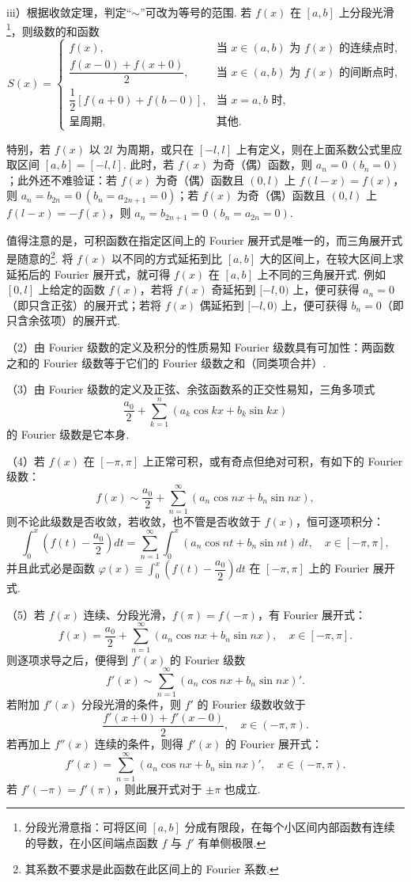 \documentclass[UTF8,12pt,a4paper,fontset=fandol]{ctexart}
\begin{document}
iii）根据收敛定理，判定“$\sim$”可改为等号的范围. 若 $f(x)$ 在 $[a,b]$ 上分段光滑\footnote{分段光滑意指：可将区间 $[a,b]$ 分成有限段，在每个小区间内部函数有连续的导数，在小区间端点函数 $f$ 与 $f'$ 有单侧极限.}，则级数的和函数
\[
S(x)=
\begin{cases}
f(x),&\text{当 }x\in(a,b)\text{ 为 }f(x)\text{ 的连续点时},\\[3pt]
\dfrac{f(x-0)+f(x+0)}2,&\text{当 }x\in(a,b)\text{ 为 }f(x)\text{ 的间断点时},\\[6pt]
\dfrac12[f(a+0)+f(b-0)],&\text{当 }x=a,b\text{ 时},\\[6pt]
\text{呈周期},&\text{其他}.
\end{cases}
\]

特别，若 $f(x)$ 以 $2l$ 为周期，或只在 $[-l,l]$ 上有定义，则在上面系数公式里应取区间 $[a,b]=[-l,l]$. 此时，若 $f(x)$ 为奇（偶）函数，则 $a_n=0\ (b_n=0)$；此外还不难验证：若 $f(x)$ 为奇（偶）函数且 $(0,l)$ 上 $f(l-x)=f(x)$，则 $a_n=b_{2n}=0\ (b_n=a_{2n+1}=0)$；若 $f(x)$ 为奇（偶）函数且 $(0,l)$ 上 $f(l-x)=-f(x)$，则 $a_n=b_{2n+1}=0\ (b_n=a_{2n}=0)$.

值得注意的是，可积函数在指定区间上的 Fourier 展开式是唯一的，而三角展开式是随意的\footnote{其系数不要求是此函数在此区间上的 Fourier 系数.}. 将 $f(x)$ 以不同的方式延拓到比 $[a,b]$ 大的区间上，在较大区间上求延拓后的 Fourier 展开式，就可得 $f(x)$ 在 $[a,b]$ 上不同的三角展开式. 例如 $[0,l]$ 上给定的函数 $f(x)$，若将 $f(x)$ 奇延拓到 $[-l,0)$ 上，便可获得 $a_n=0$（即只含正弦）的展开式；若将 $f(x)$ 偶延拓到 $[-l,0)$ 上，便可获得 $b_n=0$（即只含余弦项）的展开式.

（2）由 Fourier 级数的定义及积分的性质易知 Fourier 级数具有可加性：两函数之和的 Fourier 级数等于它们的 Fourier 级数之和（同类项合并）.

（3）由 Fourier 级数的定义及正弦、余弦函数系的正交性易知，三角多项式
\[
  \frac{a_0}2+\sum_{k=1}^{n}(a_k\cos kx+b_k\sin kx)
\]
的 Fourier 级数是它本身.

（4）若 $f(x)$ 在 $[-\pi,\pi]$ 上正常可积，或有奇点但绝对可积，有如下的 Fourier 级数：
\[
  f(x)\sim\frac{a_0}2+\sum_{n=1}^{\infty}(a_n\cos nx+b_n\sin nx),
\]
则不论此级数是否收敛，若收敛，也不管是否收敛于 $f(x)$，恒可逐项积分：
\[
  \int_0^x\left(f(t)-\frac{a_0}2\right)dt
  =\sum_{n=1}^{\infty}\int_0^x(a_n\cos nt+b_n\sin nt)\,dt,\quad x\in[-\pi,\pi],
\]
并且此式必是函数 $\varphi(x)\equiv\displaystyle\int_0^x\left(f(t)-\dfrac{a_0}2\right)dt$ 在 $[-\pi,\pi]$ 上的 Fourier 展开式.

（5）若 $f(x)$ 连续、分段光滑，$f(\pi)=f(-\pi)$，有 Fourier 展开式：
\[
  f(x)=\frac{a_0}2+\sum_{n=1}^{\infty}(a_n\cos nx+b_n\sin nx),\quad x\in[-\pi,\pi].
\]
则逐项求导之后，便得到 $f'(x)$ 的 Fourier 级数
\[
  f'(x)\sim\sum_{n=1}^{\infty}(a_n\cos nx+b_n\sin nx)'.
\]
若附加 $f'(x)$ 分段光滑的条件，则 $f'$ 的 Fourier 级数收敛于
\[
  \frac{f'(x+0)+f'(x-0)}2,\quad x\in(-\pi,\pi).
\]
若再加上 $f''(x)$ 连续的条件，则得 $f'(x)$ 的 Fourier 展开式：
\[
  f'(x)=\sum_{n=1}^{\infty}(a_n\cos nx+b_n\sin nx)',\quad x\in(-\pi,\pi).
\]
若 $f'(-\pi)=f'(\pi)$，则此展开式对于 $\pm\pi$ 也成立.
\end{document}
